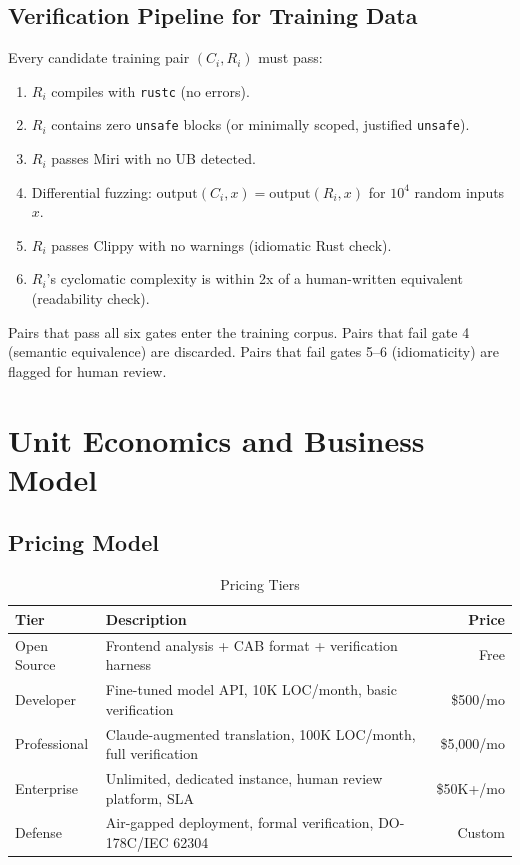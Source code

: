 \documentclass[11pt,a4paper]{article}
\theoremstyle{definition}
\theoremstyle{remark}
\begin{document}
\subsection{Verification Pipeline for Training Data}

Every candidate training pair $(C_i, R_i)$ must pass:
\begin{enumerate}[leftmargin=2em]
\item $R_i$ compiles with \texttt{rustc} (no errors).
\item $R_i$ contains zero \texttt{unsafe} blocks (or minimally scoped, justified \texttt{unsafe}).
\item $R_i$ passes Miri with no UB detected.
\item Differential fuzzing: $\text{output}(C_i, x) = \text{output}(R_i, x)$ for $10^4$ random inputs $x$.
\item $R_i$ passes Clippy with no warnings (idiomatic Rust check).
\item $R_i$'s cyclomatic complexity is within 2x of a human-written equivalent (readability check).
\end{enumerate}

Pairs that pass all six gates enter the training corpus. Pairs that fail gate 4 (semantic equivalence) are discarded. Pairs that fail gates 5--6 (idiomaticity) are flagged for human review.


\section{Unit Economics and Business Model}

\subsection{Pricing Model}

\begin{table}[H]
\centering
\caption{Pricing Tiers}
\begin{tabularx}{\textwidth}{lXr}
\toprule
\textbf{Tier} & \textbf{Description} & \textbf{Price} \\
\midrule
Open Source & Frontend analysis + CAB format + verification harness & Free \\
Developer & Fine-tuned model API, 10K LOC/month, basic verification & \$500/mo \\
Professional & Claude-augmented translation, 100K LOC/month, full verification & \$5,000/mo \\
Enterprise & Unlimited, dedicated instance, human review platform, SLA & \$50K+/mo \\
Defense & Air-gapped deployment, formal verification, DO-178C/IEC 62304 & Custom \\
\bottomrule
\end{tabularx}
\end{table}
\end{document}
